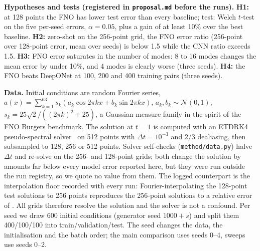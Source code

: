 \textbf{Hypotheses and tests (registered in \texttt{proposal.md} before the runs).} \textbf{H1:} at 128 points the FNO has lower test error than every baseline; test: Welch $t$-test on the five per-seed errors, $\alpha=0.05$, plus a gain of at least 10\% over the best baseline. \textbf{H2:} zero-shot on the 256-point grid, the FNO error ratio (256-point over 128-point error, mean over seeds) is below 1.5 while the CNN ratio exceeds 1.5. \textbf{H3:} FNO error saturates in the number of modes: 8 to 16 modes changes the mean error by under 10\%, and 4 modes is clearly worse (three seeds). \textbf{H4:} the FNO beats DeepONet at 100, 200 and 400 training pairs (three seeds).

\textbf{Data.} Initial conditions are random Fourier series, $a(x)=\sum_{k=1}^{63}s_k(a_k\cos2\pi kx+b_k\sin2\pi kx)$, $a_k,b_k\sim\mathcal N(0,1)$, $s_k=25\sqrt2/((2\pi k)^2+25)$, a Gaussian-measure family in the spirit of the FNO Burgers benchmark. The solution at $t=1$ is computed with an ETDRK4 pseudo-spectral solver~\cite{kassam2005fourth} on 512 points with $\Delta t=10^{-3}$ and 2/3 dealiasing, then subsampled to 128, 256 or 512 points. Solver self-checks (\texttt{method/data.py}) halve $\Delta t$ and re-solve on the 256- and 128-point grids; both change the solution by amounts far below every model error reported here, but they were run outside the run registry, so we quote no value from them. The logged counterpart is the interpolation floor recorded with every run: Fourier-interpolating the 128-point test solutions to 256 points reproduces the 256-point solutions to a relative error of . All grids therefore resolve the solution and the solver is not a confound. Per seed we draw 600 initial conditions (generator seed $1000+s$) and split them 400/100/100 into train/validation/test. The seed changes the data, the initialisation and the batch order; the main comparison uses seeds 0--4, sweeps use seeds 0--2.

